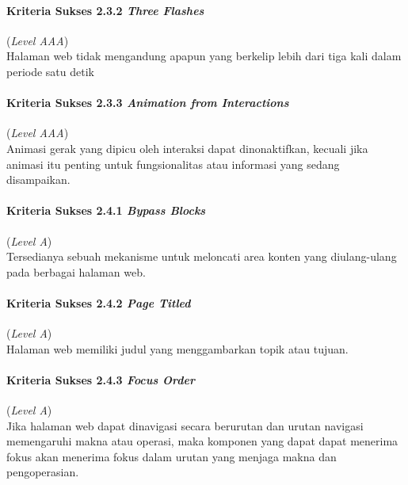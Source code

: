 \paragraph{Kriteria Sukses 2.3.2 \textit{Three Flashes}}
\label{subsec:kriteria_2.3.2}
(\textit{Level AAA}) \\

Halaman web tidak mengandung apapun yang berkelip lebih dari tiga kali dalam periode satu detik


\paragraph{Kriteria Sukses 2.3.3 \textit{Animation from Interactions}}
\label{subsec:kriteria_2.3.3}
(\textit{Level AAA}) \\

Animasi gerak yang dipicu oleh interaksi dapat dinonaktifkan, kecuali jika animasi itu penting untuk fungsionalitas atau informasi yang sedang disampaikan.

\paragraph{Kriteria Sukses 2.4.1 \textit{Bypass Blocks}}
\label{subsec:kriteria_2.4.1}
(\textit{Level A}) \\

Tersedianya sebuah mekanisme untuk meloncati area konten yang diulang-ulang pada berbagai halaman web.

\paragraph{Kriteria Sukses 2.4.2 \textit{Page Titled}}
\label{subsec:kriteria_2.4.2}
(\textit{Level A}) \\

Halaman web memiliki judul yang menggambarkan topik atau tujuan.

\paragraph{Kriteria Sukses 2.4.3 \textit{Focus Order}}
\label{subsec:kriteria_2.4.3}
(\textit{Level A}) \\

Jika halaman web dapat dinavigasi secara berurutan dan urutan navigasi memengaruhi makna atau operasi, maka komponen yang dapat dapat menerima fokus akan menerima fokus dalam urutan yang menjaga makna dan pengoperasian.

